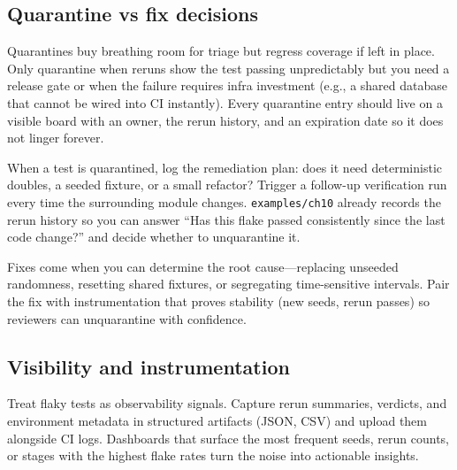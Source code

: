 \subsection{Quarantine vs fix decisions}
Quarantines buy breathing room for triage but regress coverage if left in place. Only quarantine when reruns show the test passing unpredictably but you need a release gate or when the failure requires infra investment (e.g., a shared database that cannot be wired into CI instantly). Every quarantine entry should live on a visible board with an owner, the rerun history, and an expiration date so it does not linger forever.

When a test is quarantined, log the remediation plan: does it need deterministic doubles, a seeded fixture, or a small refactor? Trigger a follow-up verification run every time the surrounding module changes. \texttt{examples/ch10} already records the rerun history so you can answer ``Has this flake passed consistently since the last code change?'' and decide whether to unquarantine it.

Fixes come when you can determine the root cause—replacing unseeded randomness, resetting shared fixtures, or segregating time-sensitive intervals. Pair the fix with instrumentation that proves stability (new seeds, rerun passes) so reviewers can unquarantine with confidence.

\subsection{Visibility and instrumentation}
Treat flaky tests as observability signals. Capture rerun summaries, verdicts, and environment metadata in structured artifacts (JSON, CSV) and upload them alongside CI logs. Dashboards that surface the most frequent seeds, rerun counts, or stages with the highest flake rates turn the noise into actionable insights.

